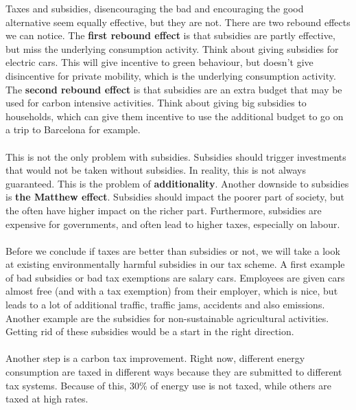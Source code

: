 \documentclass[../summary.tex]{subfiles}
\begin{document}
	  Taxes and subsidies, disencouraging the bad and encouraging the good alternative seem equally effective, but they are not. There are two rebound effects we can notice. The \textbf{first rebound effect} is that subsidies are partly effective, but miss the underlying consumption activity. Think about giving subsidies for electric cars. This will give incentive to green behaviour, but doesn't give disincentive for private mobility, which is the underlying consumption activity. The \textbf{second rebound effect} is that subsidies are an extra budget that may be used for carbon intensive activities. Think about giving big subsidies to households, which can give them incentive to use the additional budget to go on a trip to Barcelona for example.
	  \\\\
	  This is not the only problem with subsidies. Subsidies should trigger investments that would not be taken without subsidies. In reality, this is not always guaranteed. This is the problem of \textbf{additionality}. Another downside to subsidies is \textbf{the Matthew effect}. Subsidies should impact the poorer part of society, but the often have higher impact on the richer part. Furthermore, subsidies are expensive for governments, and often lead to higher taxes, especially on labour.
	  \\\\
	  Before we conclude if taxes are better than subsidies or not, we will take a look at existing environmentally harmful subsidies in our tax scheme. A first example of bad subsidies or bad tax exemptions are salary cars. Employees are given cars almost free (and with a tax exemption) from their employer, which is nice, but leads to a lot of additional traffic, traffic jams, accidents and also emissions. Another example are the subsidies for non-sustainable agricultural activities. Getting rid of these subsidies would be a start in the right direction.
	  \\\\
	  Another step is a carbon tax improvement. Right now, different energy consumption are taxed in different ways because they are submitted to different tax systems. Because of this, 30\% of energy use is not taxed, while others are taxed at high rates.
	  
\end{document}
